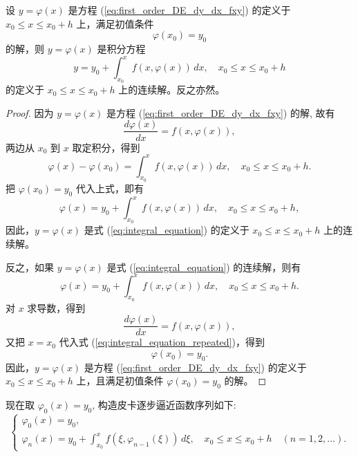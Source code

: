 \begin{proposition}[积分方程与微分方程等价]\label{prop:integral_equation_equivalence}
    设 $y=\varphi(x)$ 是方程 (\ref{eq:first_order_DE_dy_dx_fxy}) 的定义于 $x_0 \le x \le x_0+h$ 上，满足初值条件
$$\varphi(x_0)=y_0$$
的解，则 $y=\varphi(x)$ 是积分方程
\begin{equation}
y=y_0 + \int_{x_0}^{x} f(x,\varphi(x))\,dx, \quad x_0 \le x \le x_0+h \label{eq:integral_equation}
\end{equation}
的定义于 $x_0 \le x \le x_0+h$ 上的连续解。反之亦然。
\end{proposition}
\begin{proof}
    因为 $y=\varphi(x)$ 是方程 (\ref{eq:first_order_DE_dy_dx_fxy}) 的解, 故有
$$\frac{d\varphi(x)}{dx}=f(x,\varphi(x)),$$
两边从 $x_0$ 到 $x$ 取定积分，得到
$$\varphi(x)-\varphi(x_0) = \int_{x_0}^{x} f(x,\varphi(x))\,dx, \quad x_0 \le x \le x_0+h.$$
把 $\varphi(x_0)=y_0$ 代入上式，即有
$$\varphi(x)=y_0 + \int_{x_0}^{x} f(x,\varphi(x))\,dx, \quad x_0 \le x \le x_0+h,$$
因此，$y=\varphi(x)$ 是式 (\ref{eq:integral_equation}) 的定义于 $x_0 \le x \le x_0+h$ 上的连续解。

反之，如果 $y=\varphi(x)$ 是式 (\ref{eq:integral_equation}) 的连续解，则有
\begin{equation}
\varphi(x)=y_0 + \int_{x_0}^{x} f(x,\varphi(x))\,dx, \quad x_0 \le x \le x_0+h. \label{eq:integral_equation_repeated}
\end{equation}
对 $x$ 求导数，得到
$$\frac{d\varphi(x)}{dx}=f(x,\varphi(x)),$$
又把 $x=x_0$ 代入式 (\ref{eq:integral_equation_repeated})，得到
$$\varphi(x_0)=y_0.$$
因此，$y=\varphi(x)$ 是方程 (\ref{eq:first_order_DE_dy_dx_fxy}) 的定义于 $x_0 \le x \le x_0+h$ 上，且满足初值条件 $\varphi(x_0)=y_0$ 的解。
\end{proof}

现在取 $\varphi_0(x)=y_0$, 构造皮卡逐步逼近函数序列如下:
\begin{equation}
\begin{cases} \varphi_0(x) = y_0, \\ \varphi_n(x) = y_0 + \int_{x_0}^{x} f(\xi, \varphi_{n-1}(\xi))\,d\xi, \quad x_0 \le x \le x_0+h \quad (n=1,2,\dots). \end{cases} \label{eq:Picard_iteration}
\end{equation}

